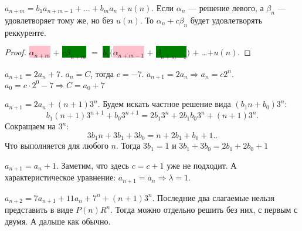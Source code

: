 \begin{theorem}
    $a_{n+m} = b_1a_{n+m-1} + \ldots + b_m a_n + u(n)$. Если $\alpha_n$ --- решение левого, а  $\beta_n$ --- удовлетворяет тому же, но без $u(n)$. То  $\alpha_n + c \beta_n$ будет удовлетворять реккуренте. 
\end{theorem}
\begin{proof}
     \colorbox{pink}{$\alpha_{n+m}$} $+$ \colorbox{green}{$c \beta_{n+m}$} $=$ \colorbox{green}{$b_1$}$($\colorbox{pink}{$\alpha_{n+m-1}$} $+$ \colorbox{green}{$\beta_{n+m-1}$}$)$ $+$ \ldots $+ u(n).$
\end{proof}
\begin{example}
    $a_{n+1} = 2a_n + 7$.  $a_n = C$, тогда  $c = -7$.  $a_{n+1} = 2a_n \Rightarrow a_n = c 2^n$.  $a_0 = c \cdot 2^0 - 7 \Rightarrow C = a_0 + 7$
\end{example}
\begin{example}
    $a_{n+1} = 2a_n + (n+1)3^n$. Будем искать частное решение вида  $(b_1n+b_0)3^n$: \[
        b_1(n+1)3^{n+1}+b_{0} 3^{n+1} = 2 b_1 3^n + 2 b_1b_0 3^n + (n+1)3^n
    .\] 
    Сокращаем на $3^n$:  \[
    3b_1n + 3b_1 + 3b_0 = n + 2b_1 + b_0 + 1.
    .\] Что выполняется для любого $n$. Тогда  $3b_1 = 1$ и $3b_1 + 3b_0 = 2b_1 + 2b_0 + 1$
\end{example}
\begin{example}
    $a_{n+1} = a_n + 1$. Заметим, что здесь  $c = c+1$ уже не подходит.  А характеристическое уравнение:  $a_{n+1} = a_n \Rightarrow \lambda = 1$.
\end{example}
\begin{example}
    $a_{n+2} = 7a_{n+1} + 11a_n + 7^n + (n+1)3^n$. Последние два слагаемые нельзя представить в виде $P(n)R^n$. Тогда можно отдельно решить без них, с первым с двумя. А дальше как обычно.
\end{example}
